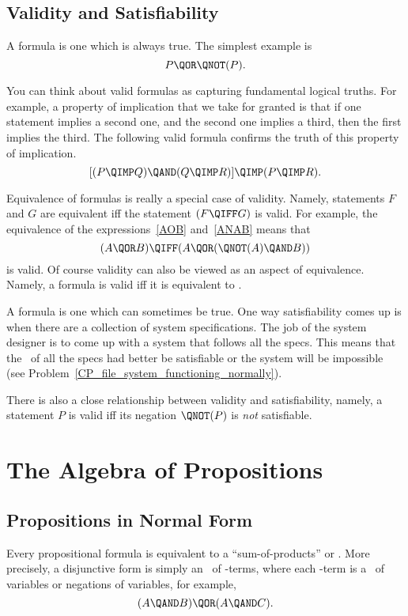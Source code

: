 \subsection{Validity and Satisfiability}
A  formula is one which is always true.  The simplest example is
\[
P \QOR \QNOT(P).
\]

You can think about valid formulas as capturing fundamental logical
truths.  For example, a property of implication that we take for
granted is that if one statement implies a second one, and the second
one implies a third, then the first implies the third.  The following
valid formula confirms the truth of this property of implication.
\[
[(P \QIMP Q) \QAND (Q \QIMP R)] \QIMP (P \QIMP R).
\]

Equivalence of formulas is really a special case of validity.  Namely,
statements $F$ and $G$ are equivalent iff the statement $(F \QIFF G)$ is
valid.  For example, the equivalence of the expressions~\ref{AOB}
and~\ref{ANAB} means that
\[
(A \QOR B) \QIFF (A \QOR (\QNOT(A) \QAND B))
\]
is valid.  Of course validity can also be viewed as an aspect of
equivalence.  Namely, a formula is valid iff it is equivalent
to \true.

A  formula is one which can sometimes be true.  One
way satisfiability comes up is when there are a collection of system
specifications.  The job of the system designer is to come up with a
system that follows all the specs.  This means that the \QAND\ of all
the specs had better be satisfiable or the system will be impossible
(see Problem~\ref{CP_file_system_functioning_normally}).

There is also a close relationship between validity and
satisfiability, namely, a statement $P$ is valid iff its negation
$\QNOT(P)$ is \emph{not} satisfiable.

\begin{problems}

\classproblems
{}
\end{problems}


\section{The Algebra of Propositions}

\subsection{Propositions in Normal Form}
Every propositional formula is equivalent to a ``sum-of-products''
or .  More precisely, a disjunctive form is
simply an \QOR\ of \QAND-terms, where each \QAND-term is a \QAND\ of
variables or negations of variables, for example, 
\begin{equation}\label{ANBOANC}
(A \QAND B) \QOR (A \QAND C).
\end{equation}

